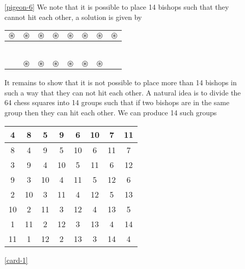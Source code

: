 \begin{enumerate}
\item[\ref{pigeon-6}] We note that it is possible to place 14 bishops such that they cannot hit each other,
a solution is given by
\begin{center}
\begin{tabular}{|c|c|c|c|c|c|c|c|}
\hline
$\circledast$ & $\circledast$ & $\circledast$ & $\circledast$ & $\circledast$ & $\circledast$ & $\circledast$ & $\circledast$\\
 \hline
 &  &  &  &  &  &  & \\
 \hline
 &  &  &  &  &  &  & \\
 \hline
 &  &  &  &  &  &  & \\
 \hline
 &  &  &  &  &  &  & \\
 \hline
 &  &  &  &  &  &  & \\
 \hline
 &  &  &  &  &  &  & \\
 \hline
 & $\circledast$ & $\circledast$ & $\circledast$ & $\circledast$ & $\circledast$ & $\circledast$ & \\
 \hline
\end{tabular}
\end{center}
It remains to show that it is not possible to place more than 14 bishops in such a way that they can not hit each other.
A natural idea is to divide the 64 chess squares into 14 groups such that if two bishops are in the same group then
they can hit each other. We can produce 14 such groups
\begin{center}
\begin{tabular}{|c|c|c|c|c|c|c|c|}
\hline
4 & 8 & 5 & 9 & 6 & 10 & 7 & 11\\
\hline
8 & 4 & 9 & 5 & 10 & 6 & 11 & 7\\
\hline
3 & 9 & 4 & 10 & 5 & 11 & 6 & 12\\
\hline
9 & 3 & 10 & 4 & 11 & 5 & 12 & 6\\
\hline
2 & 10 & 3 & 11 & 4 & 12 & 5 & 13\\
\hline
10 & 2 & 11 & 3 & 12 & 4 & 13 & 5\\
\hline
1 & 11 & 2 & 12 & 3 & 13 & 4 & 14\\
\hline
11 & 1 & 12 & 2 & 13 & 3 & 14 & 4\\
\hline
\end{tabular}
\end{center}

\item[\ref{card-1}]


\end{enumerate}
